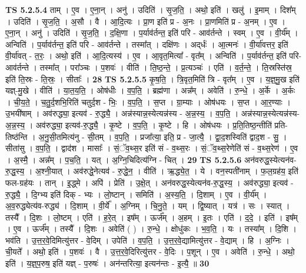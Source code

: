 \documentclass[17pt]{extarticle}
\begin{document}
                  \newline
                                \textbf{ TS 5.2.5.4} \newline
                  ताम् । ए॒व । ए॒ना॒न् । अनु॑ । उदिति॑ । सृ॒ज॒ति॒ । अथो॒ इति॑ । खलु॑ । इ॒माम् । दिश᳚म् । उदिति॑ । सृ॒ज॒ति॒ । अ॒सौ । वै । आ॒दि॒त्यः । प्रा॒ण इति॑ प्र - अ॒नः । प्रा॒णमिति॑ प्र - अ॒नम् । ए॒व । ए॒ना॒न् । अनु॑ । उदिति॑ । सृ॒ज॒ति॒ । द॒क्षि॒णा । प॒र्याव॑र्तन्त॒ इति॑ परि - आव॑र्तन्ते । स्वम् । ए॒व । वी॒र्य᳚म् । अन्विति॑ । प॒र्याव॑र्तन्त॒ इति॑ परि - आव॑र्तन्ते । तस्मा᳚त् । दक्षि॑णः । अद्‌र्धः॑ । आ॒त्मनः॑ । वी॒र्या॑वत्तर॒ इति॑ वी॒र्या॑वत् - त॒रः॒ । अथो॒ इति॑ । आ॒दि॒त्यस्य॑ । ए॒व । आ॒वृत॒मित्या᳚ - वृत᳚म् । अन्विति॑ । प॒र्याव॑र्तन्त॒ इति॑ परि-आव॑र्तन्ते । तस्मा᳚त् । परा᳚ञ्चः । प॒शवः॑ । वीति॑ । ति॒ष्ठ॒न्ते॒ । प्र॒त्यञ्चः॑ । एति॑ । व॒र्त॒न्ते॒ । ति॒स्रस्ति॑स्र॒ इति॑ ति॒स्रः - ति॒स्रः॒ । सीताः᳚ । \textbf{  28} \newline
                  \newline
                                \textbf{ TS 5.2.5.5} \newline
                  कृ॒ष॒ति॒ । त्रि॒वृत॒मिति॑ त्रि - वृत᳚म् । ए॒व । य॒ज्ञ्॒मु॒ख इति॑ यज्ञ्-मु॒खे । वीति॑ । या॒त॒य॒ति॒ । ओष॑धीः । व॒प॒ति॒ । ब्रह्म॑णा । अन्न᳚म् । अवेति॑ । रु॒न्धे॒ । अ॒र्के । अ॒र्कः । ची॒य॒ते॒ । च॒तु॒र्द॒शभि॒रिति॑ चतुर्द॒श - भिः॒ । व॒प॒ति॒ । स॒प्त । ग्रा॒म्याः । ओष॑धयः । स॒प्त । आ॒र॒ण्याः । उ॒भयी॑षाम् । अव॑रुद्ध्या॒ इत्यव॑ - रु॒द्ध्यै॒ । अन्न॑स्यान्न॒स्येत्यन्न॑स्य - अ॒न्न॒स्य॒ । व॒प॒ति॒ । अन्न॑स्यान्न॒स्येत्यन्न॑स्य-अ॒न्न॒स्य॒ । अव॑रुद्ध्या॒ इत्यव॑-रु॒द्ध्यै॒ । कृ॒ष्टे । व॒प॒ति॒ । कृ॒ष्टे । हि । ओष॑धयः । प्र॒ति॒तिष्ठ॒न्तीति॑ प्रति-तिष्ठ॑न्ति । अ॒नु॒सी॒तमित्य॑नु - सी॒तम् । व॒प॒ति॒ । प्रजा᳚त्या॒ इति॒ प्र - जा॒त्यै॒ । द्वा॒द॒शस्विति॑ द्वाद॒श - सु॒ । सीता॑सु । व॒प॒ति॒ । द्वाद॑श । मासाः᳚ । सं॒ॅव॒थ्स॒र इति॑ सं - व॒थ्स॒रः । सं॒ॅव॒थ्स॒रेणेति॑ सं - व॒थ्स॒रेण॑ । ए॒व । अ॒स्मै॒ । अन्न᳚म् । प॒च॒ति॒ । यत् । अ॒ग्नि॒चिदित्य॑ग्नि - चित् । \textbf{  29} \newline
                  \newline
                                \textbf{ TS 5.2.5.6} \newline
                  अन॑वरुद्ध॒स्येत्यन॑व-रु॒द्ध॒स्य॒ । अ॒श्नी॒यात् । अव॑रुद्धे॒नेत्यव॑ - रु॒द्धे॒न॒ । वीति॑ । ऋ॒द्ध्ये॒त॒ । ये । वन॒स्पती॑नाम् । फ॒ल॒ग्रह॑य॒ इति॑ फल-ग्रह॑यः । तान् । इ॒द्ध्मे । अपि॑ । प्रेति॑ । उ॒क्षे॒त् । अन॑वरुद्ध॒स्येत्यन॑व-रु॒द्ध॒स्य॒ । अव॑रुद्ध्या॒ इत्यव॑ - रु॒द्ध्यै॒ । दि॒ग्भ्य इति॑ दिक् - भ्यः । लो॒ष्टान् । समिति॑ । अ॒स्य॒ति॒ । दि॒शाम् । ए॒व । वी॒र्य᳚म् । अ॒व॒रुद्ध्येत्य॑व-रुद्ध्य॑ । दि॒शाम् । वी॒र्ये᳚ । अ॒ग्निम् । चि॒नु॒ते॒ । यम् । द्वि॒ष्यात् । यत्र॑ । सः । स्यात् । तस्यै᳚ । दि॒शः । लो॒ष्टम् । एति॑ । ह॒रे॒त् । इष᳚म् । ऊर्ज᳚म् । अ॒हम् । इ॒तः । एति॑ । द॒दे॒ । इति॑ । इष᳚म् । ए॒व । ऊर्ज᳚म् । तस्यै᳚ । दि॒शः । अवेति॑ ( ) । रु॒न्धे॒ । क्षोधु॑कः । भ॒व॒ति॒ । यः । तस्या᳚म् । दि॒शि । भव॑ति । उ॒त्त॒र॒वे॒दिमित्यु॑त्तर - वे॒दिम् । उपेति॑ । व॒प॒ति॒ । उ॒त्त॒र॒वे॒द्यामित्यु॑त्तर - वे॒द्याम् । हि । अ॒ग्निः । ची॒यते᳚ । अथो॒ इति॑ । प॒शवः॑ । वै । उ॒त्त॒र॒वे॒दिरित्यु॑त्तर - वे॒दिः । प॒शून् । ए॒व । अवेति॑ । रु॒न्धे॒ । अथो॒ इति॑ । य॒ज्ञ्॒प॒रुष॒ इति॑ यज्ञ् - प॒रुषः॑ । अन॑न्तरित्या॒ इत्यन॑न्तः - इ॒त्यै॒ ॥ \textbf{  30} \newline
\end{document}
